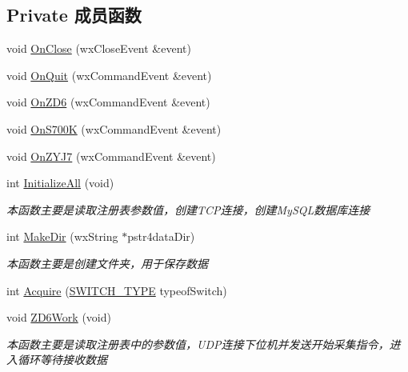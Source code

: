 \subsection*{Private 成员函数}
\begin{DoxyCompactItemize}
\item 
void \hyperlink{classmonitor_client_frame_aa744f336117172b7ab41864141a1ed2d}{On\+Close} (wx\+Close\+Event \&event)
\item 
void \hyperlink{classmonitor_client_frame_a62c5559e9a3d4da08a0d6705baa47b95}{On\+Quit} (wx\+Command\+Event \&event)
\item 
void \hyperlink{classmonitor_client_frame_a9ceeffc68f5f33c6fd97bba9bfbea284}{On\+Z\+D6} (wx\+Command\+Event \&event)
\item 
void \hyperlink{classmonitor_client_frame_a566bd9bdaa3933a188c130b6d6a166b5}{On\+S700K} (wx\+Command\+Event \&event)
\item 
void \hyperlink{classmonitor_client_frame_a77801fb08b609cf2a5521906f1ced65f}{On\+Z\+Y\+J7} (wx\+Command\+Event \&event)
\item 
int \hyperlink{classmonitor_client_frame_a06d8b6cb7153736934b17fca7fd5c715}{Initialize\+All} (void)
\begin{DoxyCompactList}\small\item\em 本函数主要是读取注册表参数值，创建\+T\+C\+P连接，创建\+My\+S\+Q\+L数据库连接 \end{DoxyCompactList}\item 
int \hyperlink{classmonitor_client_frame_adbc6a4d0a12ea3ab300eb9c9f8c0126b}{Make\+Dir} (wx\+String $\ast$pstr4data\+Dir)
\begin{DoxyCompactList}\small\item\em 本函数主要是创建文件夹，用于保存数据 \end{DoxyCompactList}\item 
int \hyperlink{classmonitor_client_frame_a182446582639b75bd7eba0eb0133ca57}{Acquire} (\hyperlink{_c_udp_server_8h_a41273fdeb63230b3a5c360d8c7c11b82}{S\+W\+I\+T\+C\+H\+\_\+\+T\+Y\+PE} typeof\+Switch)
\item 
void \hyperlink{classmonitor_client_frame_ad67e14332e85cc8058e45d73778d6491}{Z\+D6\+Work} (void)
\begin{DoxyCompactList}\small\item\em 本函数主要是读取注册表中的参数值，\+U\+D\+P连接下位机并发送开始采集指令，进入循环等待接收数据 \end{DoxyCompactList}\end{DoxyCompactItemize}

